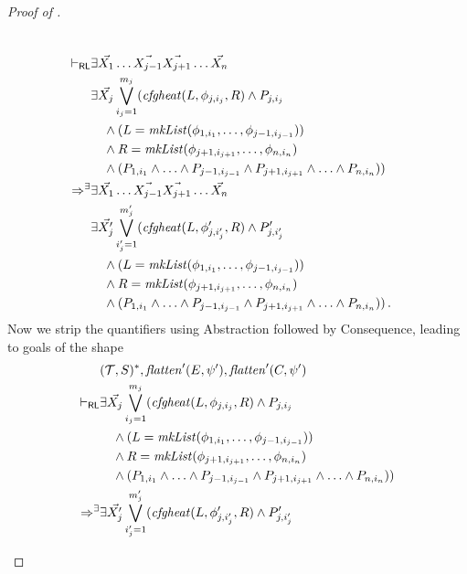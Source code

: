 \begin{proof}[Proof of ]
\begin{enumerate}
\begin{align*}
        \\ \vdash_{\mathsf{RL}} &
        \exists \vec{X_1} \ldots \vec{X_{j-1}} \vec{X_{j+1}} \ldots \vec{X_n}
        \\& \exists \vec{X_j} \bigvee_{i_j=1}^{m_j} (\mathit{cfgheat}(L, \phi_{j, i_j}, R) \land P_{j, i_j}
        \\&\quad \land (L = \mathit{mkList}(\phi_{1, i_1}, \ldots, \phi_{j-1, i_{j-1}}))
        \\&\quad \land R = \mathit{mkList}(\phi_{j+1, i_{j+1}}, \ldots, \phi_{n, i_{n}})
        \\&\quad \land (P_{1, i_1} \land \ldots \land P_{j-1, i_{j-1}} \land P_{j+1, i_{j+1}} \land \ldots \land P_{n, i_n}))
        \\ \Rightarrow^\exists &
        \exists \vec{X_1} \ldots \vec{X_{j-1}} \vec{X_{j+1}} \ldots \vec{X_n}
        \\& \exists \vec{X^\prime_j} \bigvee_{i^\prime_j=1}^{m^\prime_j} (\mathit{cfgheat}(L, \phi^\prime_{j, i^\prime_j}, R) \land P^\prime_{j, i^\prime_j}
        \\&\quad \land (L = \mathit{mkList}(\phi_{1, i_1}, \ldots, \phi_{j-1, i_{j-1}}))
        \\&\quad \land R = \mathit{mkList}(\phi_{j+1, i_{j+1}}, \ldots, \phi_{n, i_{n}})
        \\&\quad \land (P_{1, i_1} \land \ldots \land P_{j-1, i_{j-1}} \land P_{j+1, i_{j+1}} \land \ldots \land P_{n, i_n})) \, .
    \end{align*}
    Now we strip the quantifiers using Abstraction followed by Consequence,
    leading to goals of the shape
    \begin{align*}
        & (\mathcal{T}, S)^*, \mathit{flatten}^\prime(E, \psi^\prime), \mathit{flatten}^\prime(C, \psi^\prime)
        \\ \vdash_\RL &
        \exists \vec{X_j} \bigvee_{i_j=1}^{m_j} (\mathit{cfgheat}(L, \phi_{j, i_j}, R) \land P_{j, i_j}
        \\&\quad \land (L = \mathit{mkList}(\phi_{1, i_1}, \ldots, \phi_{j-1, i_{j-1}}))
        \\&\quad \land R = \mathit{mkList}(\phi_{j+1, i_{j+1}}, \ldots, \phi_{n, i_{n}})
        \\&\quad \land (P_{1, i_1} \land \ldots \land P_{j-1, i_{j-1}} \land P_{j+1, i_{j+1}} \land \ldots \land P_{n, i_n}))
        \\ \Rightarrow^\exists &
        \exists \vec{X^\prime_j} \bigvee_{i^\prime_j=1}^{m^\prime_j} (\mathit{cfgheat}(L, \phi^\prime_{j, i^\prime_j}, R) \land P^\prime_{j, i^\prime_j}

\end{align*}
\end{enumerate}
\end{proof}
